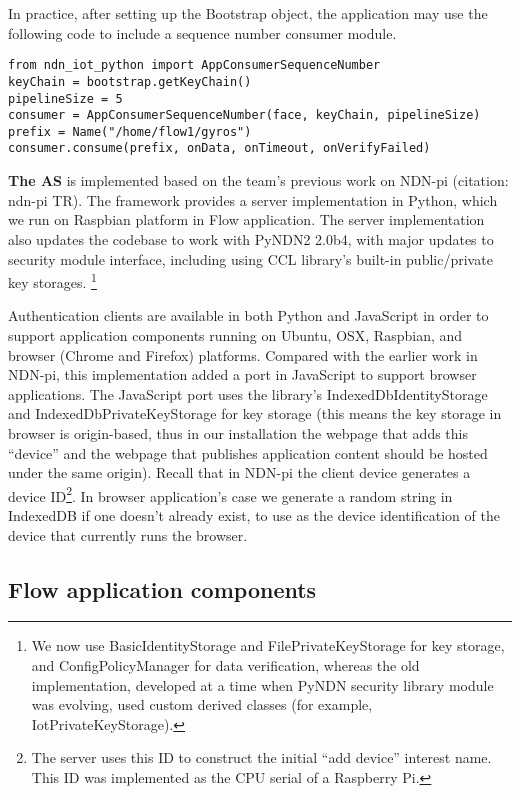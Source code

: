 In practice, after setting up the Bootstrap object, the application may use the following code to include a sequence number consumer module.

\begin{verbatim}
from ndn_iot_python import AppConsumerSequenceNumber
keyChain = bootstrap.getKeyChain()
pipelineSize = 5
consumer = AppConsumerSequenceNumber(face, keyChain, pipelineSize)
prefix = Name("/home/flow1/gyros")
consumer.consume(prefix, onData, onTimeout, onVerifyFailed)
\end{verbatim}

\textbf{The AS} is implemented based on the team's previous work on NDN-pi (citation: ndn-pi TR).
The framework provides a server implementation in Python, which we run on Raspbian platform in Flow application.
The server implementation also updates the codebase to work with PyNDN2 2.0b4, with major updates to security module interface, including using CCL library's built-in public/private key storages. \footnote{We now use BasicIdentityStorage and FilePrivateKeyStorage for key storage, and ConfigPolicyManager for data verification, whereas the old implementation, developed at a time when PyNDN security library module was evolving, used custom derived classes (for example, IotPrivateKeyStorage).}

Authentication clients are available in both Python and JavaScript in order to support application components running on Ubuntu, OSX, Raspbian, and browser (Chrome and Firefox) platforms.
Compared with the earlier work in NDN-pi, this implementation added a port in JavaScript to support browser applications. 
The JavaScript port uses the library's IndexedDbIdentityStorage and IndexedDbPrivateKeyStorage for key storage (this means the key storage in browser is origin-based, thus in our installation the webpage that adds this ``device'' and the webpage that publishes application content should be hosted under the same origin). 
Recall that in NDN-pi the client device generates a device ID\footnote{The server uses this ID to construct the initial ``add device'' interest name. This ID was implemented as the CPU serial of a Raspberry Pi.}. 
In browser application's case we generate a random string in IndexedDB if one doesn't already exist, to use as the device identification of the device that currently runs the browser.

\subsection{Flow application components}


